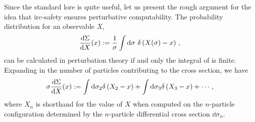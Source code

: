


Since the standard lore is quite useful, let us present the rough argument for the idea that \gls{irc-safety} ensures perturbative computability.
%
The probability distribution for an observable \(X\),
\begin{align}
    \label{eq:prob_distribution}
    \frac{\dd\Sigma}{\dd X}(x)
    :=
    \frac{1}{\sigma}
    \int \dd \sigma
    \,\,
    \delta\le(X(\sigma) - x\ri)
    \,,
\end{align}
can be calculated in perturbation theory if and only the integral of  is finite.
%
Expanding in the number of particles contributing to the cross section, we have
\begin{align}
    \label{eq:prob_distribution}
    \sigma \frac{\dd\Sigma}{\dd X}(x)
    :=
    \int \dd\sigma_2 \delta\le(X_2 - x\ri)
    +
    \int \dd\sigma_3 \delta\le(X_3 - x\ri)
    +
    \cdots
    \,,
\end{align}
where \(X_n\) is shorthand for the value of \(X\) when computed on the \(n\)-particle configuration determined by the \(n\)-particle differential cross section \(\dd \sigma_n\).

